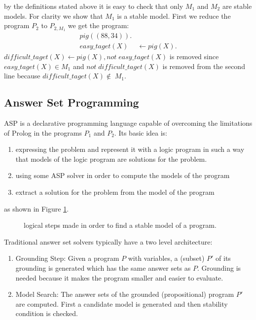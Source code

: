 by the definitions stated above it is easy to check that only \(M_1\) and \(M_2\) are stable models. For clarity we show that \(M_1\) is a stable model. First we reduce the program \(P_2\) to \(P_{2,M_1}\) we get the program:
\begin{align}
pig((88,34)).& \\
easy\_taget(X) &\leftarrow pig(X). 
\end{align}
\(difficult\_taget(X) \leftarrow pig(X), not\; easy\_taget(X) \) is removed since \(easy\_taget(X) \in M_1\) and \(not\; difficult\_taget(X)\) is removed from the second line because \(difficult\_taget(X) \notin\; M_1\).
\subsection{Answer Set Programming}

ASP \cite{} is a declarative programming language capable of overcoming the limitations of Prolog in the programs \(P_1\) and \(P_2\). Its basic idea is:
\begin{enumerate}
\item expressing the problem and represent it with a logic program in such a way that models of the logic program are solutions for the problem.
\item using some ASP solver in order to compute the models of the program
\item extract a solution for the problem from the model of the program
\end{enumerate}
as shown in Figure \ref{fig:ASP1}.
\begin{figure}
  \begin{center}
  \end{center}
  \caption{logical steps made in order to find a stable model of a program.}
  \label{fig:ASP1}
\end{figure}
 
Traditional answer set solvers typically have a two level architecture:
\begin{enumerate}
\item Grounding Step: Given a program \(P\) with variables, a (subset) \(P'\) of its grounding is generated which has the same answer sets as \(P\). Grounding is needed because it makes the program smaller and easier to evaluate.
\item Model Search: The answer sets of the grounded (propositional) program \(P'\) are computed. First a candidate model is generated and then stability condition is checked.
\end{enumerate}

